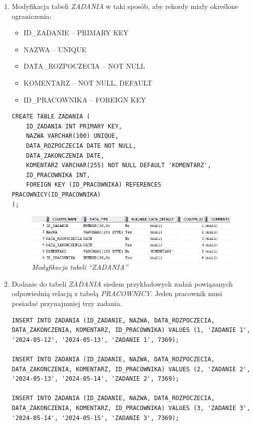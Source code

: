 \documentclass{article}
\begin{document}
\begin{enumerate}
\item Modyfikacja tabeli \emph{ZADANIA} w taki sposób, aby rekordy miały określone ograniczenia:
\begin{itemize}
\item ID\_ZADANIE -- PRIMARY KEY
\item NAZWA -- UNIQUE
\item DATA\_ROZPOCZECIA -- NOT NULL
\item KOMENTARZ -- NOT NULL, DEFAULT
\item ID\_PRACOWNIKA -- FOREIGN KEY
\end{itemize}

\begin{lstlisting}[style=SQL, caption=\textit{Modyfikacja tabeli ``ZADANIA''}]
CREATE TABLE ZADANIA (
    ID_ZADANIA INT PRIMARY KEY,
    NAZWA VARCHAR(100) UNIQUE,
    DATA_ROZPOCZECIA DATE NOT NULL,
    DATA_ZAKONCZENIA DATE,
    KOMENTARZ VARCHAR(255) NOT NULL DEFAULT 'KOMENTARZ',
    ID_PRACOWNIKA INT,
    FOREIGN KEY (ID_PRACOWNIKA) REFERENCES PRACOWNICY(ID_PRACOWNIKA)
);
\end{lstlisting}

\begin{figure}[H]
	\centering
	\includegraphics[scale=1.2]{zadanie6.png}
	\caption{\textit{Modyfikacja tabeli ``ZADANIA''}}
\end{figure}

\item Dodanie do tabeli \emph{ZADANIA} siedem przykładowych zadań powiązanych odpowiednią relacją z tabelą \emph{PRACOWNICY}. Jeden pracownik musi posiadać przynajmniej trzy zadania.

\begin{lstlisting}[style=SQL, caption=\textit{Dodanie do tabeli ``ZADANIA''}]
INSERT INTO ZADANIA (ID_ZADANIE, NAZWA, DATA_ROZPOCZECIA, DATA_ZAKONCZENIA, KOMENTARZ, ID_PRACOWNIKA) VALUES (1, 'ZADANIE 1', '2024-05-12', '2024-05-13', 'ZADANIE 1', 7369);

INSERT INTO ZADANIA (ID_ZADANIE, NAZWA, DATA_ROZPOCZECIA, DATA_ZAKONCZENIA, KOMENTARZ, ID_PRACOWNIKA) VALUES (2, 'ZADANIE 2', '2024-05-13', '2024-05-14', 'ZADANIE 2', 7369);

INSERT INTO ZADANIA (ID_ZADANIE, NAZWA, DATA_ROZPOCZECIA, DATA_ZAKONCZENIA, KOMENTARZ, ID_PRACOWNIKA) VALUES (3, 'ZADANIE 3', '2024-05-14', '2024-05-15', 'ZADANIE 3', 7369);


\end{lstlisting}
\end{enumerate}
\end{document}
